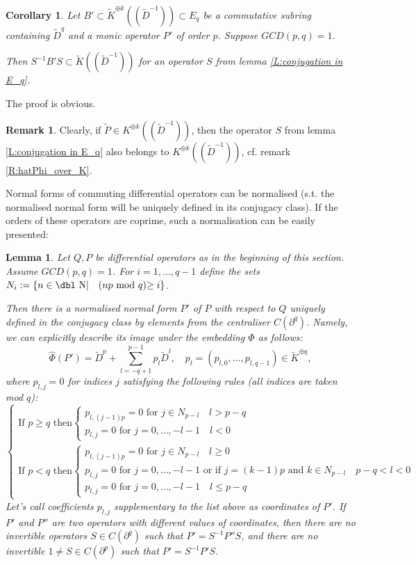 \documentclass[11pt]{article}
\theoremstyle{definition}
\newcommand{\dn}{{\mbox{\dbl N}}}
\newtheorem{rem}{Remark}[section]
\theoremstyle{plain}
\newtheorem{lemma}{Lemma}[section]
\newtheorem{cor}{Corollary}[section]
\numberwithin{equation}{section}
\begin{document}
\begin{cor}
\label{C:Schur_subring}
Let $B'\subset \tilde{K}^{\oplus k}((\tilde{D}^{-1}))\subset E_q$ be a commutative subring containing $\tilde{D}^q$ and a monic operator $P'$ of order $p$. Suppose $GCD(p,q)=1$. 

Then $S^{-1}B'S\subset \tilde{K}((\tilde{D}^{-1}))$ for an operator $S$ from lemma \ref{L:conjugation in E_q}.
\end{cor} 

The proof is obvious. 

\begin{rem}
\label{R:S_over_K}
Clearly, if $\tilde{P}\in K^{\oplus k}((\tilde{D}^{-1}))$, then the operator $S$ from lemma \ref{L:conjugation in E_q} also belongs to $K^{\oplus k}((\tilde{D}^{-1}))$, cf. remark \ref{R:hatPhi_over_K}.
\end{rem}

Normal forms of commuting differential operators can be normalised (s.t. the normalised normal form will be uniquely defined in its conjugacy class). If the orders of these operators are coprime, such a normalisation can be easily presented:

\begin{lemma}
\label{L:normalisation}
Let $Q,P$ be differential operators as in the beginning of this section. Assume $GCD(p,q)=1$. 
For $i=1, \ldots , q-1$ define the sets $N_i:=\{n\in \dn |\quad \mbox{($np$ mod $q$)$\ge i$}\}$. 
  
Then there is a normalised normal form $P'$ of $P$ with respect to $Q$ uniquely defined in the conjugacy class  by elements from the centraliser $C(\partial^q)$. Namely, we can explicitly describe its image under the embedding $\hat{\Phi}$ as follows:
$$
\hat{\Phi}(P')=\tilde{D}^p +\sum_{l=-q+1}^{p-1} p_l \tilde{D}^l, \quad p_l=(p_{l,0},\ldots ,p_{l,q-1})\in \tilde{K}^{\oplus q},
$$
where $p_{l,j}=0$ for indices $j$ satisfying the following rules (all indices are taken mod $q$):
$$
\begin{cases}
\mbox{If $p\ge q$ then} 
\begin{cases}
p_{l,(j-1)p}=\mbox{$0$ for $j\in N_{p-l}$}\quad l>p-q \\
p_{l,j}=\mbox{$0$ for $j=0,\ldots ,-l-1$} \quad l<0
\end{cases}
\\
\mbox{If $p< q$ then}
\begin{cases}
p_{l,(j-1)p}=\mbox{$0$ for $j\in N_{p-l}$}\quad l\ge 0 \\
p_{l,j}=\mbox{$0$ for $j=0,\ldots ,-l-1$ or if $j=(k-1)p$ and $k\in N_{p-l}$}\quad p-q<l<0 \\
p_{l,j}=\mbox{$0$ for $j=0,\ldots ,-l-1$} \quad l\le p-q
\end{cases}
\end{cases}
$$
Let's call coefficients $p_{l,j}$ supplementary to the list above as {\it coordinates} of  $P'$. If $P'$ and $P''$ are two operators with different values of coordinates, then there are no invertible operators $S\in C(\partial^q)$ such that $P'=S^{-1}P''S$, and there are no invertible $1\neq S\in C(\partial^p)$ such that $P'=S^{-1}P'S$. 

\end{lemma}
\end{document}
